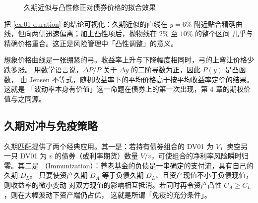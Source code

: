 \begin{figure}[htbp]
\centering
{}
\caption{久期近似与凸性修正对债券价格的拟合效果}\label{fig:01-convexity}
\end{figure}

 把 \cref{ex:01-duration} 的结论可视化：久期近似的直线在 $y = 6\%$
附近贴合精确曲线，但向两侧迅速偏离；加上凸性项后，抛物线在 $2\%$ 至 $10\%$ 的整个区间
几乎与精确价格重合。这正是风险管理中「凸性调整」的意义。

\begin{intuitionbox}[为什么凸性是好事]
想象价格曲线是一张绷紧的弓。收益率上升与下降幅度相同时，弓的上弯让价格少跌多涨。
用数学语言说，$\Delta P/P$ 关于 $\Delta y$ 的二阶导数为正，因此 $P(y)$ 是凸函数，
由 Jensen 不等式，随机收益率下的平均价格高于按平均收益率定价的结果。这就是
「波动率本身有价值」这一命题在债券上的第一次出现，第 4 章的期权价值与之同源。
\end{intuitionbox}

\subsection{久期对冲与免疫策略}

久期匹配提供了两个经典应用。其一是：若持有债券组合的 DV01 为 $V$，卖空另一只
DV01 为 $v$ 的债券（或利率期货）数量 $V/v$，可使组合的净利率风险瞬时归零。其二是
（Immunization）：养老基金的负债是一串确定的支付流，具有自己的久期 $D_L$。
只要使资产久期 $D_A$ 等于负债久期 $D_L$、且资产现值不小于负债现值，则收益率的微小变动
对双方现值的影响相互抵消。若同时再令资产凸性 $C_A \ge C_L$，则在大幅波动下资产端仍占优，
这就是所谓「免疫的充分条件」。

